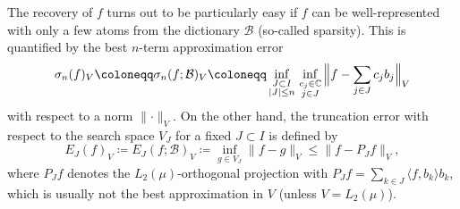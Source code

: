 \documentclass[11pt,reqno, a4paper]{article}
\numberwithin{equation}{section}
\begin{document}
The recovery of $f$ turns out to be particularly easy if $f$ can be well-represented with only a few atoms from the dictionary $\mathcal{B}$ (so-called sparsity).
This is quantified by the best $n$-term approximation error
\begin{equation}
    \sigma_n(f)_V\coloneqq\sigma_n(f;\mathcal{B})_V \coloneqq \inf\limits_{\substack{J \subset I\\\lvert J \rvert \leq n}} \,\inf\limits_{\substack{c_j\in\mathbb{C}\\j\in J}}\,\Bigl\lVert f-\sum\limits_{j\in J}c_jb_j\Bigr\rVert_V
\end{equation}
with respect to a norm $\lVert\cdot\rVert_V$.
On the other hand, the truncation error with respect to the search space $V_J$ for a fixed $J\subset I$ is defined by
\begin{equation}\label{eq:ApproxError}
	E_J(f)_V\coloneqq E_J(f;\mathcal{B})_V\coloneqq \inf_{g \in V_J}\lVert f - g\rVert_V \leq \|f-P_Jf \|_{V},
\end{equation}
where $P_J f$ denotes the $L_2(\mu)$-orthogonal projection with $P_J f = \sum_{k\in J} \langle f,b_k\rangle b_k$, which is usually not the best approximation in $V$ (unless $V=L_2(\mu)$). 
\end{document}
